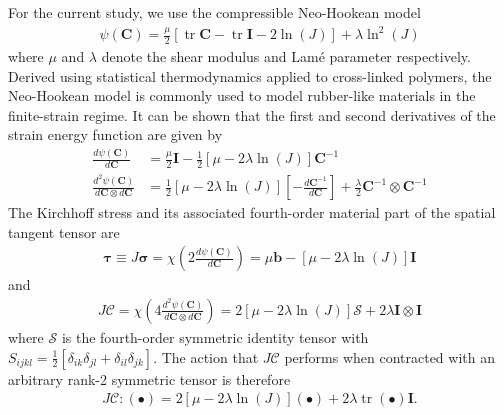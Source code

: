 \documentclass[times,doublespace]{nmeauth}
\DeclareMathOperator{\trace}{tr}
\begin{document}
For the current study, we use the compressible Neo-Hookean model
\begin{gather}
\psi \left( \mathbf{C} \right)
  = \frac{\mu}{2} \left[ \trace{\mathbf{C}} - \trace{\mathbf{I}} - 2 \ln\left( J \right) \right]
  + \lambda \ln^{2}\left( J \right)
\end{gather}
where $\mu$ and $\lambda$ denote the shear modulus and Lam\'{e} parameter respectively.
Derived using statistical thermodynamics applied to cross-linked polymers, the Neo-Hookean model \cite{Treloar1975a,Treloar1976a} is commonly used to model rubber-like materials in the finite-strain regime.
It can be shown that the first and second derivatives of the strain energy function are given by
\begin{align}
\frac{d \psi \left( \mathbf{C} \right)}{d \mathbf{C}}
  &= \frac{\mu}{2} \mathbf{I} - \frac{1}{2} \left[ \mu - 2\lambda\ln\left( J \right) \right] \mathbf{C}^{-1} \\
\frac{d^{2} \psi \left( \mathbf{C} \right)}{d \mathbf{C} \otimes d \mathbf{C}}
  &= \frac{1}{2}\left[ \mu - 2\lambda\ln\left( J \right) \right] \left[ - \frac{d \mathbf{C}^{-1}}{d \mathbf{C}} \right]
  + \frac{\lambda}{2} \mathbf{C}^{-1} \otimes \mathbf{C}^{-1}
\end{align}
The Kirchhoff stress and its associated fourth-order material part of the spatial tangent tensor are
\begin{gather}
\boldsymbol{\tau}
  \equiv J \boldsymbol{\sigma}
  = \chi\left( 2 \frac{d \psi \left( \mathbf{C} \right)}{d \mathbf{C}} \right)
  = \mu \mathbf{b} - \left[ \mu - 2\lambda\ln\left( J \right) \right] \mathbf{I}
\end{gather}
and
\begin{gather}
J \boldsymbol{\mathcal{C}}
  = \chi\left( 4 \frac{d^{2} \psi \left( \mathbf{C} \right)}{d \mathbf{C} \otimes d \mathbf{C}} \right)
  = 2 \left[ \mu - 2\lambda\ln\left( J \right) \right] \boldsymbol{\mathcal{S}}
  + 2 \lambda \mathbf{I} \otimes \mathbf{I}
\end{gather}
where $\boldsymbol{\mathcal{S}}$ is the fourth-order symmetric identity tensor
with $S_{ijkl}=\frac{1}{2}\left[\delta_{ik}\delta_{jl}+\delta_{il}\delta_{jk}\right]$.
The action that $J \boldsymbol{\mathcal{C}}$ performs when contracted with an arbitrary rank-2 symmetric tensor is therefore
\begin{gather}
J \boldsymbol{\mathcal{C}} : \left( \bullet \right)
  = 2 \left[ \mu - 2\lambda\ln\left( J \right) \right] \left( \bullet \right)
  + 2 \lambda \trace\left( \bullet \right) \mathbf{I}.
\label{eq:simplified_action}
\end{gather}
\end{document}
